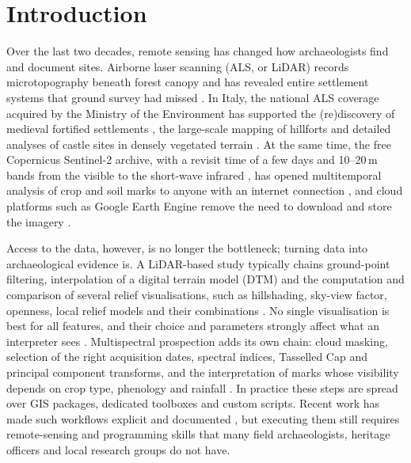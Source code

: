 \section{Introduction}
\label{sec:intro}

Over the last two decades, remote sensing has changed how archaeologists find and document sites. Airborne laser scanning (ALS, or LiDAR) records microtopography beneath forest canopy and has revealed entire settlement systems that ground survey had missed \citep{devereux2005woodland,chase2012geospatial,vinci2024review}. In Italy, the national ALS coverage acquired by the Ministry of the Environment has supported the (re)discovery of medieval fortified settlements \citep{lasaponara2009fullwave,masini2018canopy}, the large-scale mapping of hillforts \citep{fontana2022hillforts} and detailed analyses of castle sites in densely vegetated terrain \citep{corbo2024land,corbo2025groma}. At the same time, the free Copernicus Sentinel-2 archive, with a revisit time of a few days and 10--20\,m bands from the visible to the short-wave infrared \citep{drusch2012sentinel2}, has opened multitemporal analysis of crop and soil marks to anyone with an internet connection \citep{agapiou2014sentinel,tapete2018sentinel,abate2020sentinel}, and cloud platforms such as Google Earth Engine remove the need to download and store the imagery \citep{gorelick2017gee}.

Access to the data, however, is no longer the bottleneck; turning data into archaeological evidence is. A LiDAR-based study typically chains ground-point filtering, interpolation of a digital terrain model (DTM) and the computation and comparison of several relief visualisations, such as hillshading, sky-view factor, openness, local relief models and their combinations \citep{zaksek2011svf,doneus2013openness,hesse2010lrm,kokalj2019single}. No single visualisation is best for all features, and their choice and parameters strongly affect what an interpreter sees \citep{bennett2012comparison,stular2012visualization,kokalj2017guide}. Multispectral prospection adds its own chain: cloud masking, selection of the right acquisition dates, spectral indices, Tasselled Cap and principal component transforms, and the interpretation of marks whose visibility depends on crop type, phenology and rainfall \citep{kauth1976tasseled,agapiou2013window,masini2018cropmarks,kalayci2019contrast,abate2020sentinel}. In practice these steps are spread over GIS packages, dedicated toolboxes \citep{kokalj2016rvt,challis2011toolkit} and custom scripts. Recent work has made such workflows explicit and documented \citep{lozic2021workflow,corbo2024land}, but executing them still requires remote-sensing and programming skills that many field archaeologists, heritage officers and local research groups do not have.

